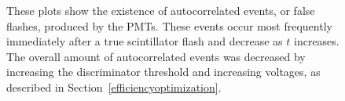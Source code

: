 \begin{figure}[h]
\begin{center}
\hspace{-7mm}
\vspace{-2mm}
\vspace{-2mm}
\vspace{-2mm}
\caption{\small{These plots show the existence of autocorrelated events, or false flashes, produced by the PMTs.  These events occur most frequently immediately after a true scintillator flash and decrease as $t$ increases.  The overall amount of autocorrelated events was decreased by increasing the discriminator threshold and increasing voltages, as described in Section~\ref{efficiencyoptimization}.}}
\label{fig:autocorr}
\end{center}
\end{figure}


